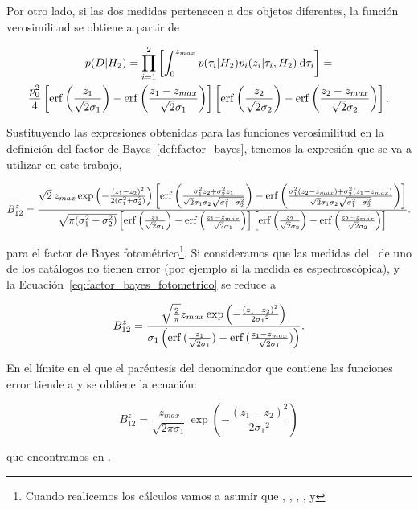 Por otro lado, si las dos medidas pertenecen a dos objetos diferentes, la función verosimilitud se obtiene a partir de

\begin{multline*}
    p(D|H_2)=\prod_{i=1}^{2}\left[\int_{0}^{z_{max}} p({\tau}_{i}|H_2){p}_{i}(z_i|{\tau}_{i},H_2)\:\mathrm{d}{\tau}_{i} \right]=\\
    \frac{p_0^2}{4}\left[\operatorname{erf}{\left(\frac{z_1}{\sqrt{2}\sigma_1}\right)}-\operatorname{erf}{\left(\frac{z_1-z_{max}}{\sqrt{2}\sigma_1}\right)}\right]\left[\operatorname{erf}{\left(\frac{z_2}{\sqrt{2}\sigma_2} \right)}-\operatorname{erf}{\left(\frac{z_2-z_{max}}{\sqrt{2}\sigma_2} \right)}\right].
\end{multline*}

Sustituyendo las expresiones obtenidas para las funciones verosimilitud en la definición del factor de Bayes~\ref{def:factor_bayes}, tenemos la expresión que se va a utilizar en este trabajo,

\begin{equation}\label{eq:factor_bayes_fotometrico}
    B_{12}^{z}=\frac{\sqrt{2}\:z_{max}\exp{\left(-\frac{{(z_1-z_2)}^{2}}{2({\sigma}_{1}^{2}+{\sigma}_{2}^{2})}\right)}\left[ \operatorname{erf}{\left( \frac{{\sigma}_{1}^{2}z_2+{\sigma}_{2}^{2}z_1}{\sqrt{2}\sigma_1\sigma_2\sqrt{\sigma_1^2+\sigma_2^2}}  \right)}- \operatorname{erf}{\left( \frac{{\sigma}_{1}^{2}(z_2-z_{max})+\sigma_2^2(z_1-z_{max})}{\sqrt{2}\sigma_1\sigma_2\sqrt{\sigma_1^2+\sigma_2^2}}  \right)} \right]}{\sqrt{\pi(\sigma_1^2+\sigma_2^2)}\left[\operatorname{erf}{\left(\frac{z_1}{\sqrt{2}\sigma_1}\right)}-\operatorname{erf}{\left(\frac{z_1-z_{max}}{\sqrt{2}\sigma_1}\right)}\right]\left[\operatorname{erf}{\left(\frac{z_2}{\sqrt{2}\sigma_2} \right)}-\operatorname{erf}{\left(\frac{z_2-z_{max}}{\sqrt{2}\sigma_2} \right)}\right]}.
\end{equation}

para el factor de Bayes fotométrico\footnote{Cuando realicemos los cálculos vamos a asumir que , , , ,  y }. Si consideramos que las medidas del \rt\ de uno de los catálogos no tienen error (por ejemplo si la medida es espectroscópica),  y la Ecuación~\ref{eq:factor_bayes_fotometrico} se reduce a

\begin{equation*}
    B_{12}^{z}=\frac{\sqrt{\frac{2}{\pi}}z_{max}\exp{\left(-\frac{{(z_1-z_2)}^{2}}{2{\sigma_1}^2}\right)}}{\sigma_1 \left( \operatorname{erf}{(\frac{z_1}{\sqrt{2}\sigma_1})}-\operatorname{erf}{(\frac{z_1-z_{max}}{\sqrt{2}\sigma_1})} \right)}.
\end{equation*}

En el límite en el que  el paréntesis del denominador que contiene las funciones error tiende a  y se obtiene la ecuación:

\begin{equation*}
    B_{12}^{z}=\frac{z_{max}}{\sqrt{2\pi\sigma_1}}\exp{\left(-\frac{{(z_1-z_2)}^{2}}{2{\sigma_1}^2}\right)}
\end{equation*}

que encontramos en \cite{tesis:alberto_manjon}.